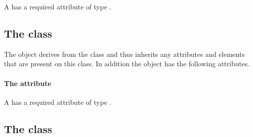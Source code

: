 A \TransformationComponent has a required attribute
 of type .


\subsection{The  class}
\label{csgprimitive-class}




The \CSGPrimitive object derives from the \CSGNode class and thus
inherits any attributes and elements that are present on this class.
In addition the \CSGPrimitive object has the following attributes.

\paragraph{The \fixttspace{} attribute}

A \CSGPrimitive has a required attribute  of type
.


\subsection{The  class}
\label{csgsetoperator-class}




